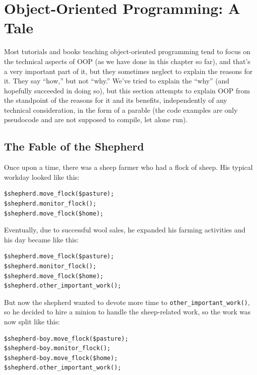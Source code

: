 \section{Object-Oriented Programming: A Tale}

Most tutorials and books teaching object-oriented 
programming tend to focus on the technical aspects 
of OOP (as we have done in this chapter so far), and 
that's a very important part of it, but they sometimes 
neglect to explain the reasons for it. They say ``how,'' 
but not ``why.'' We've tried to explain the ``why'' (and 
hopefully succeeded in doing so), but this section attempts to 
explain OOP from the standpoint of the reasons for it 
and its benefits, independently of any technical 
consideration, in the form of a parable (the code 
examples are only pseudocode and are not supposed 
to compile, let alone run). 

\subsection{The Fable of the Shepherd} 

Once upon a time, there was a sheep farmer who had a 
flock of sheep. His typical workday looked like this:

\begin{verbatim}
$shepherd.move_flock($pasture);
$shepherd.monitor_flock();
$shepherd.move_flock($home);
\end{verbatim}

Eventually, due to successful wool sales, he expanded 
his farming activities and his day became like this:

\begin{verbatim}
$shepherd.move_flock($pasture);
$shepherd.monitor_flock();
$shepherd.move_flock($home);
$shepherd.other_important_work();
\end{verbatim}

But now the shepherd wanted to devote more time to 
\verb'other_important_work()', so he decided to hire 
a minion to handle the sheep-related work, so the 
work was now split like this:

\begin{verbatim}
$shepherd-boy.move_flock($pasture);
$shepherd-boy.monitor_flock();
$shepherd-boy.move_flock($home);
$shepherd.other_important_work();
\end{verbatim}

